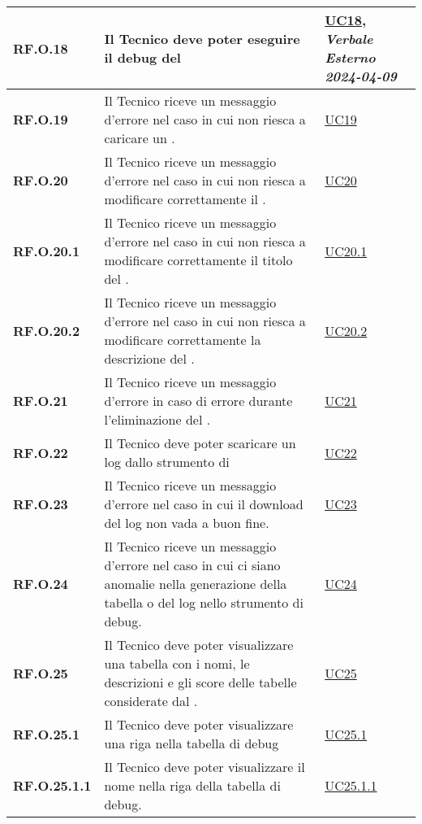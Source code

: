 \begin{longtable}{|P{3cm}|P{6,5cm}|>{\arraybackslash}P{4cm}|}
    \hline
    \textbf{RF.O.18} & Il Tecnico deve poter eseguire il debug del  &  \hyperref[UC18]{UC18}, \emph{Verbale Esterno 2024-04-09}\\
    \hline
    \textbf{RF.O.19} & Il Tecnico riceve un messaggio d'errore nel caso in cui non riesca a caricare un . & \hyperref[UC19]{UC19} \\
    \hline 
    \textbf{RF.O.20} & Il Tecnico riceve un messaggio d'errore nel caso in cui non riesca a modificare correttamente il . & \hyperref[UC20]{UC20} \\
    \hline
    \textbf{RF.O.20.1} & Il Tecnico riceve un messaggio d'errore nel caso in cui non riesca a modificare correttamente il titolo del . & \hyperref[UC20point1]{UC20.1} \\
    \hline
    \textbf{RF.O.20.2} & Il Tecnico riceve un messaggio d'errore nel caso in cui non riesca a modificare correttamente la descrizione del . & \hyperref[UC20point2]{UC20.2} \\
    \hline
    \textbf{RF.O.21} & Il Tecnico riceve un messaggio d'errore in caso di errore durante l'eliminazione del . &  \hyperref[21]{UC21}\\
    \hline
    \textbf{RF.O.22} & Il Tecnico deve poter scaricare un log dallo strumento di &  \hyperref[UC22]{UC22}\\
    \hline
    \textbf{RF.O.23} & Il Tecnico riceve un messaggio d'errore nel caso in cui il download del log non vada a buon fine. &  \hyperref[UC23]{UC23}\\
    \hline
    \textbf{RF.O.24} & Il Tecnico riceve un messaggio d'errore nel caso in cui ci siano anomalie nella generazione della tabella o del log nello strumento di debug. &  \hyperref[UC24]{UC24}\\
    \hline
    \textbf{RF.O.25} & Il Tecnico deve poter visualizzare una tabella con i nomi, le descrizioni e gli score delle tabelle considerate dal . &  \hyperref[UC25]{UC25}\\
    \hline
    \textbf{RF.O.25.1} & Il Tecnico deve poter visualizzare una riga nella tabella di debug &  \hyperref[UC25point1]{UC25.1}\\
    \hline
    \textbf{RF.O.25.1.1} & Il Tecnico deve poter visualizzare il nome nella riga della tabella di debug. &  \hyperref[UC25poin1point1]{UC25.1.1}\\
    \hline

\end{longtable}
